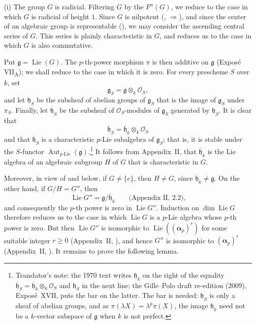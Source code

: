 
(i) The group \(G\) is radicial.  Filtering \(G\) by the \(F^n(G)\), we
reduce to the case in which \(G\) is radicial of height \(1\).
Since \(G\) is nilpotent (, \(\Rightarrow\)), and since
the center of an algebraic group is representable
(), we may consider the ascending central series
of \(G\).  This series is plainly characteristic in \(G\), and
reduces us to the case in which \(G\) is also commutative.

Put \(\mathfrak g=\operatorname{Lie}(G)\).  The \(p\)-th-power
morphism \(\pi\) is then additive on \(\mathfrak g\)
(Exposé VII\textsubscript{A}); we shall reduce to the case in which
it is zero.  For every prescheme \(S\) over \(k\), set
\[
  \mathfrak g_S=\mathfrak g\otimes_k\mathcal O_S,
\]
and let \(\mathfrak h_S\) be the subsheaf of abelian groups of
\(\mathfrak g_S\) that is the image of \(\mathfrak g_S\) under
\(\pi_S\).  Finally, let \(\overline{\mathfrak h}_S\) be the
subsheaf of \(\mathcal O_S\)-modules of \(\mathfrak g_S\) generated
by \(\mathfrak h_S\).  It is clear that
\[
  \overline{\mathfrak h}_S
  =\overline{\mathfrak h}_k\otimes_k\mathcal O_S
\]
and that \(\overline{\mathfrak h}_S\)
is a characteristic \(p\)-Lie subalgebra of \(\mathfrak g_S\);
that is, it is stable under the \(S\)-functor
\(\operatorname{Aut}_{p\text{-}\mathrm{Lie}}(\mathfrak g)\).\footnote{Translator's note: the 1970 text writes
\(\mathfrak h_k\) on the right of the equality
\(\overline{\mathfrak h}_S=\overline{\mathfrak h}_k\otimes_k\mathcal O_S\) and \(\mathfrak h_S\) in the
next line; the Gille--Polo draft re-edition (2009), Exposé~XVII, puts the bar on the latter. The bar is
needed: \(\mathfrak h_S\) is only a sheaf of abelian groups, and as \(\pi(\lambda X)=\lambda^p\pi(X)\), the
image \(\mathfrak h_k\) need not be a \(k\)-vector subspace of \(\mathfrak g\) when \(k\) is not perfect.}
It follows from Appendix~II,  that
\(\overline{\mathfrak h}_k\) is the Lie algebra of an algebraic
subgroup \(H\) of \(G\) that is characteristic in \(G\).

Moreover, in view of  and  below, if
\(G\ne\{e\}\), then \(H\ne G\), since
\(\overline{\mathfrak h}_k\ne\mathfrak g\).  On the other hand, if
\(G/H=G''\), then
\[
  \operatorname{Lie}G''
  =\mathfrak g/\overline{\mathfrak h}_k
  \qquad\text{(Appendix~II, 2.2),}
\]
and consequently the \(p\)-th power is zero in
\(\operatorname{Lie}G''\).  Induction on
\(\dim\operatorname{Lie}G\) therefore reduces us to the case in
which \(\operatorname{Lie}G\) is a \(p\)-Lie algebra whose
\(p\)-th power is zero.  But then \(\operatorname{Lie}G''\) is
isomorphic to \(\operatorname{Lie}((\boldsymbol\alpha_p)^r)\) for
some suitable integer \(r\geq0\) (Appendix~II, ), and hence
\(G''\) is isomorphic to \((\boldsymbol\alpha_p)^r\)
(Appendix~II, ).  It remains to prove the following lemma.

